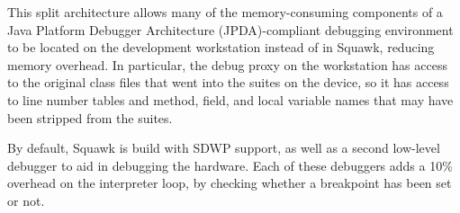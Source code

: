 \documentclass{sigplanconf}
\newcommand{\centertablebegin}{\begin{table}[htp] \begin{center}}
\newcommand{\centertableend}[2]{{\bf \caption{\label{#1} {#2}}} \end{center} \end{table} }
\begin{document}
This split architecture allows many of the memory-consuming components of a
Java Platform Debugger Architecture (JPDA)-compliant debugging environment to
be located on the development workstation instead of in Squawk, reducing
memory overhead.
In particular, the debug proxy on the workstation has access to the original
class files that went into the suites on the device, so it has access to line
number tables and method, field, and local variable names that may have been
stripped from the suites.

By default, Squawk is build with SDWP support, as well as a second 
low-level debugger to aid in debugging the hardware.  
Each of these debuggers adds a 10\% overhead on the interpreter 
loop, by checking whether a breakpoint has been set or not. 

%
\end{document}

